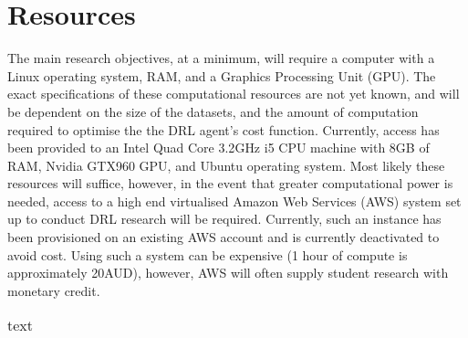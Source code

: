 \section{Resources}
The main research objectives, at a minimum, will require a computer with a Linux operating system, RAM, and a Graphics Processing Unit (GPU). The exact specifications of these computational resources are not yet known, and will be dependent on the size of the datasets, and the amount of computation required to optimise the the DRL agent's cost function. Currently, access has been provided to an Intel Quad Core 3.2$\si{\giga\hertz}$ i5 CPU machine with 8GB of RAM, Nvidia GTX960 GPU, and Ubuntu operating system. Most likely these resources will suffice, however, in the event that greater computational power is needed, access to a high end virtualised Amazon Web Services (AWS) system set up to conduct DRL research will be required. Currently, such an instance has been provisioned on an existing AWS account and is currently deactivated to avoid cost. Using such a system can be expensive (1 hour of compute is approximately 20AUD), however, AWS will often supply student research with monetary credit.\\
\begin{table}[h]
	\caption{text}
	\centering
	\begin{tabular}{ll}
	\toprule
	
	\midrule
	
	\bottomrule
	\end{tabular}
\end{table}